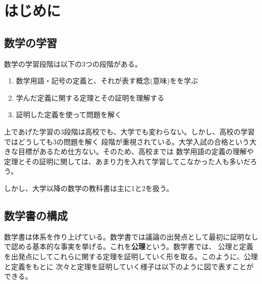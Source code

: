 \documentclass{jlreq}
\begin{document}
\section{はじめに}
\subsection{数学の学習}
数学の学習段階は以下の3つの段階がある。

\begin{enumerate}
    \item 数学用語・記号の定義と、それが表す概念(意味)をを学ぶ
    \item 学んだ定義に関する定理とその証明を理解する
    \item 証明した定義を使って問題を解く
\end{enumerate}

上であげた学習の3段階は高校でも、大学でも変わらない。しかし、高校の学習ではどうしても3の問題を解く
段階が重視されている。大学入試の合格という大きな目標があるため仕方ない。そのため、高校までは
数学用語の定義の理解や定理とその証明に関しては、あまり力を入れて学習してこなかった人も多いだろう。

しかし、大学以降の数学の教科書は主に1と2を扱う。

\subsection{数学書の構成}
数学書は体系を作り上げている。数学書では議論の出発点として最初に証明なしで認める基本的な事実を挙げる。これを\textbf{公理}という。数学書では、
公理と定義を出発点にしてこれらに関する定理を証明していく形を取る。このように、公理と定義をもとに
次々と定理を証明していく様子は以下のように図で表すことができる。
\end{document}
